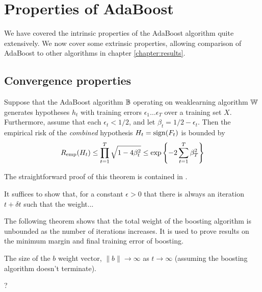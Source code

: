 \section{Properties of AdaBoost}

We have covered the intrinsic properties of the AdaBoost algorithm quite
extensively.  We now cover some extrinsic properties, allowing
comparison of AdaBoost to other algorithms in chapter
\ref{chapter:results}.

\subsection{Convergence properties}

\begin{theorem}
\label{thm:AdaBoost training error convergence}
Suppose that the AdaBoost algorithm $\mathbb{B}$ operating on weaklearning
algorithm $\mathbb{W}$ generates hypotheses $h_t$ with training errors
$\epsilon_1 \ldots \epsilon_T$ over a training set $X$.  Furthermore,
assume that each $\epsilon_t < 1/2$, and let $\beta_t = 1/2 -
\epsilon_t$.  Then the empirical risk of the \emph{combined}
hypothesis $H_t = \mathrm{sign}(F_t)$ is bounded by
%
\begin{equation}
R_{\mathrm{emp}}(H_t) \leq \prod_{t=1}^{T} \sqrt{1 - 4 \beta_t^2} \leq \exp
\left\{ - 2 \sum_{t=1}^T \beta_T^2 \right\}
\end{equation}
\end{theorem}

\proof The straightforward proof of this theorem is contained in
\cite{Freund97}.


\begin{theorem}
\label{thm:increasing classifier weights}
\end{theorem}

\proof It suffices to show that, for a constant $\epsilon > 0$ that
there is always an iteration $t + \delta t$ such that the weight...


The following theorem shows that the total weight of the boosting
algorithm is unbounded as the number of iterations increases.  It is
used to prove results on the minimum margin and final training error
of boosting.

\begin{theorem}
The size of the $b$ weight vector, $\|b\| \rightarrow \infty$
as $t \rightarrow \infty$ (assuming the boosting algorithm doesn't
terminate).

\proof ?
\end{theorem}



